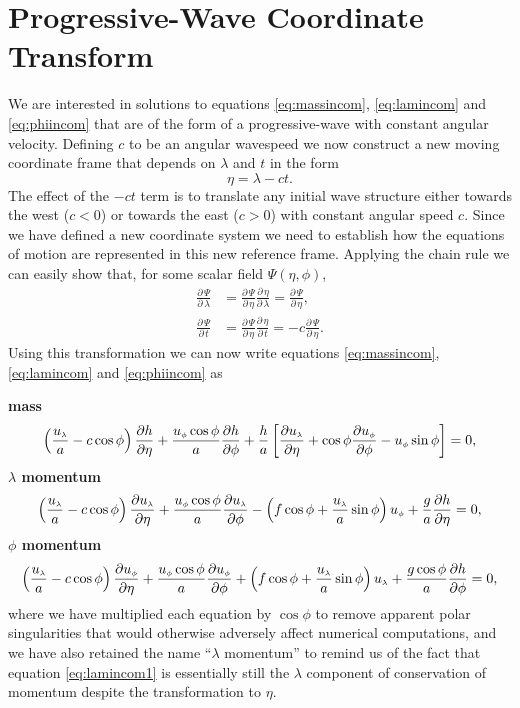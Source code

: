\section{Progressive-Wave Coordinate Transform} \label{sec:progresswave}
We are interested in solutions to equations \eqref{eq:massincom}, \eqref{eq:lamincom} and \eqref{eq:phiincom} that are of the form of a progressive-wave with constant angular velocity. Defining $c$ to be an angular wavespeed we now construct a new moving coordinate frame that depends on $\lambda$ and $t$ in the form
\begin{equation}
\eta=\lambda - ct.
\end{equation} 
The effect of the $-ct$ term is to translate any initial wave structure either towards the west ($c<0$) or towards the east ($c>0$) with constant angular speed $c$. Since we have defined a new coordinate system we need to establish how the equations of motion are represented in this new reference frame. Applying the chain rule we can easily show that, for some scalar field $\Psi(\eta,\phi)$,
\begin{align}
\frac{\partial \, \Psi}{\partial \, \lambda} &= \frac{\partial \, \Psi}{\partial \, \eta}\frac{\partial \, \eta}{\partial \, \lambda}=\frac{\partial \, \Psi}{\partial \, \eta},\\[3mm]
\frac{\partial \, \Psi}{\partial \, t} &= \frac{\partial \, \Psi}{\partial \, \eta}\frac{\partial \, \eta}{\partial \, t}=-c\frac{\partial \, \Psi}{\partial \, \eta}.
\end{align}
Using this transformation we can now write equations \eqref{eq:massincom}, \eqref{eq:lamincom} and \eqref{eq:phiincom} as

{\bfseries mass}
\begin{equation}
\left(\frac{{u_{\scriptscriptstyle \lambda}}}{a}-c\cos\phi\right){\frac{\partial h}{\partial \eta}}+\frac{{u_{\scriptscriptstyle \phi}}\cos\phi}{a}{\frac{\partial h}{\partial \phi}}+\frac{h}{a}\left[{\frac{\partial {\ensuremath{u_{\scriptscriptstyle \lambda}}}}{\partial \eta}}+\cos\phi{\ensuremath{\frac{\partial {\ensuremath{u_{\scriptscriptstyle \phi}}}}{\partial \phi}}}-{u_{\scriptscriptstyle \phi}}\sin\phi\right]=0, \label{eq:massincom1}
\end{equation}
{\bfseries \boldmath$\lambda$ momentum}
\begin{equation}
\left(\frac{{u_{\scriptscriptstyle \lambda}}}{a}-c\cos\phi\right){\frac{\partial {\ensuremath{u_{\scriptscriptstyle \lambda}}}}{\partial \eta}} + \frac{{u_{\scriptscriptstyle \phi}}\cos\phi}{a}{\frac{\partial {\ensuremath{u_{\scriptscriptstyle \lambda}}}}{\partial \phi}} - \left(f\cos\phi + \frac{{u_{\scriptscriptstyle \lambda}}}{a}\sin\phi \right){u_{\scriptscriptstyle \phi}} + \frac{g}{a}{\frac{\partial h}{\partial \eta}} = 0, \label{eq:lamincom1}
\end{equation}
{\bfseries \boldmath$\phi$ momentum}
\begin{equation}
\left(\frac{{u_{\scriptscriptstyle \lambda}}}{a}-c\cos\phi\right){\frac{\partial {\ensuremath{u_{\scriptscriptstyle \phi}}}}{\partial \eta}}+\frac{{u_{\scriptscriptstyle \phi}}\cos\phi}{a}{\frac{\partial {\ensuremath{u_{\scriptscriptstyle \phi}}}}{\partial \phi}}+\left(f\cos\phi+\frac{{u_{\scriptscriptstyle \lambda}}}{a}\sin\phi \right){u_{\scriptscriptstyle \lambda}}+\frac{g\cos\phi}{a}{\frac{\partial h}{\partial \phi}}=0, \label{eq:phiincom1}
\end{equation}
where we have multiplied each equation by $\cos\phi$ to remove apparent polar singularities that would otherwise adversely affect numerical computations, and we have also retained the name ``$\lambda$ momentum'' to remind us of the fact that equation \eqref{eq:lamincom1} is essentially still the $\lambda$ component of conservation of momentum despite the transformation to $\eta$.


